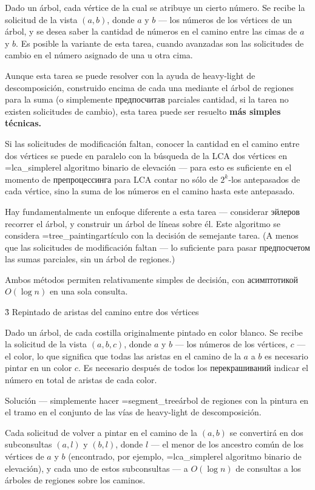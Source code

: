 Dado un árbol, cada vértice de la cual se atribuye un cierto número. Se recibe la solicitud de la vista $(a,b)$, donde $a$ y $b$ --- los números de los vértices de un árbol, y se desea saber la cantidad de números en el camino entre las cimas de $a$ y $b$. Es posible la variante de esta tarea, cuando avanzadas son las solicitudes de cambio en el número asignado de una u otra cima.

Aunque esta tarea se puede resolver con la ayuda de heavy-light de descomposición, construido encima de cada una mediante el árbol de regiones para la suma (o simplemente предпосчитав parciales cantidad, si la tarea no existen solicitudes de cambio), esta tarea puede ser resuelto \bf{más simples técnicas}.

Si las solicitudes de modificación faltan, conocer la cantidad en el camino entre dos vértices se puede en paralelo con la búsqueda de la LCA dos vértices en \algohref=lca_simpler{el algoritmo binario de elevación} --- para esto es suficiente en el momento de препроцессинга para LCA contar no sólo de $2^k$-los antepasados de cada vértice, sino la suma de los números en el camino hasta este antepasado.

Hay fundamentalmente un enfoque diferente a esta tarea --- considerar эйлеров recorrer el árbol, y construir un árbol de líneas sobre él. Este algoritmo se considera \algohref=tree_painting{artículo con la decisión de semejante tarea}. (A menos que las solicitudes de modificación faltan --- lo suficiente para pasar предпосчетом las sumas parciales, sin un árbol de regiones.)

Ambos métodos permiten relativamente simples de decisión, con асимптотикой $O (\log n)$ en una sola consulta.


\h3{ Repintado de aristas del camino entre dos vértices }

Dado un árbol, de cada costilla originalmente pintado en color blanco. Se recibe la solicitud de la vista $(a,b,c)$, donde $a$ y $b$ --- los números de los vértices, $c$ --- el color, lo que significa que todas las aristas en el camino de la $a$ a $b$ es necesario pintar en un color $c$. Es necesario después de todos los перекрашиваний indicar el número en total de aristas de cada color.

Solución --- simplemente hacer \algohref=segment_tree{árbol de regiones con la pintura en el tramo} en el conjunto de las vías de heavy-light de descomposición.

Cada solicitud de volver a pintar en el camino de la $(a,b)$ se convertirá en dos subconsultas $(a,l)$ y $(b,l)$, donde $l$ --- el menor de los ancestro común de los vértices de $a$ y $b$ (encontrado, por ejemplo, \algohref=lca_simpler{el algoritmo binario de elevación}), y cada uno de estos subconsultas --- a $O (\log n)$ de consultas a los árboles de regiones sobre los caminos.

